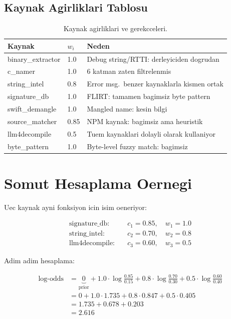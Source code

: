 \documentclass[12pt,a4paper,oneside]{book}
\theoremstyle{definition}
\begin{document}
\subsection{Kaynak Agirliklari Tablosu}

\begin{table}[h]
\centering
\begin{tabular}{llp{7cm}}
\toprule
\textbf{\color{sectioncyan}Kaynak} & \textbf{\color{sectioncyan}$w_i$} & \textbf{\color{sectioncyan}Neden} \\
\midrule
binary\_extractor & 1.0 & Debug string/RTTI: derleyiciden dogrudan \\
c\_namer & 1.0 & 6 katman zaten filtrelenmis \\
string\_intel & 0.8 & Error msg.\ benzer kaynaklarla kismen ortak \\
signature\_db & 1.0 & FLIRT: tamamen bagimsiz byte pattern \\
swift\_demangle & 1.0 & Mangled name: kesin bilgi \\
source\_matcher & 0.85 & NPM kaynak: bagimsiz ama heuristik \\
llm4decompile & 0.5 & Tuem kaynaklari dolayli olarak kullaniyor \\
byte\_pattern & 1.0 & Byte-level fuzzy match: bagimsiz \\
\bottomrule
\end{tabular}
\caption{Kaynak agirliklari ve gerekcceleri.}
\label{tab:weights}
\end{table}

\section{Somut Hesaplama Oernegi}
\label{sec:bayesian-example}

Uec kaynak ayni fonksiyon icin isim oeneriyor:

\begin{align}
\text{signature\_db:} \quad & c_1 = 0.85, \quad w_1 = 1.0 \\
\text{string\_intel:} \quad & c_2 = 0.70, \quad w_2 = 0.8 \\
\text{llm4decompile:} \quad & c_3 = 0.60, \quad w_3 = 0.5
\end{align}

Adim adim hesaplama:

\begin{align}
\text{log-odds} &= \underbrace{0}_{\text{prior}} + 1.0 \cdot \log\frac{0.85}{0.15} + 0.8 \cdot \log\frac{0.70}{0.30} + 0.5 \cdot \log\frac{0.60}{0.40} \\
&= 0 + 1.0 \cdot 1.735 + 0.8 \cdot 0.847 + 0.5 \cdot 0.405 \\
&= 1.735 + 0.678 + 0.203 \\
&= 2.616
\end{align}
\end{document}
